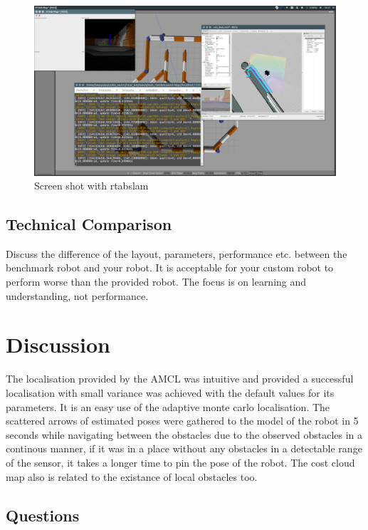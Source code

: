 \documentclass[10pt,journal,compsoc]{IEEEtran}
\begin{document}
\begin{figure}[thpb]
      \centering
      \includegraphics[width=\linewidth]{./img/rtabslam_racerbot.png}
      \caption{Screen shot with rtabslam}
      \label{fig:rtabslam_racerbot}
\end{figure}


\subsection{Technical Comparison} %
Discuss the difference of the layout, parameters, performance etc. between the benchmark robot and your robot. It is acceptable for your custom robot to perform worse than the provided robot. The focus is on learning and understanding, not performance. 

\section{Discussion}

The localisation provided by the AMCL was intuitive and provided a successful localisation with small variance was achieved with the default values for its parameters. It is an easy use of the adaptive monte carlo localisation. The scattered arrows of estimated poses were gathered to the model of the robot in 5 seconds while navigating between the obstacles due to the observed obstacles in a continous manner, if it was in a place without any obstacles in a detectable range of the sensor, it takes a longer time to pin the pose of the robot. The cost cloud map also is related to the existance of local obstacles too.


\subsection{Questions}
\end{document}
